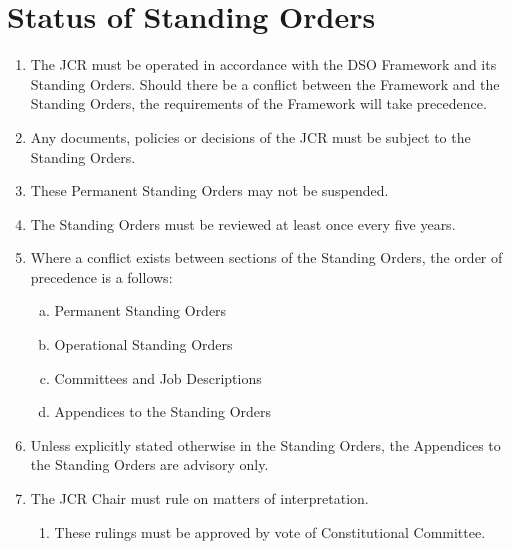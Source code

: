 \documentclass[12pt]{article}  %
\begin{document}
\section{Status of Standing Orders}
\begin{enumerate}
    \item The JCR must be operated in accordance with the DSO Framework and its Standing Orders. Should there be a conflict between the Framework and the Standing Orders, the requirements of the Framework will take precedence.
    \item Any documents, policies or decisions of the JCR must be subject to the Standing Orders.
    \item These Permanent Standing Orders may not be suspended.
    \item The Standing Orders must be reviewed at least once every five years.
    \item Where a conflict exists between sections of the Standing Orders, the order of precedence is a follows:
    \begin{enumerate}[a)]
        \item Permanent Standing Orders
        \item Operational Standing Orders
        \item Committees and Job Descriptions
        \item Appendices to the Standing Orders
    \end{enumerate}
    \item Unless explicitly stated otherwise in the Standing Orders, the Appendices to the Standing Orders are advisory only.
    \item The JCR Chair must rule on matters of interpretation.
    \begin{enumerate}
        \item These rulings must be approved by vote of Constitutional Committee.
    \end{enumerate}
\end{enumerate}
\newpage
\end{document}
